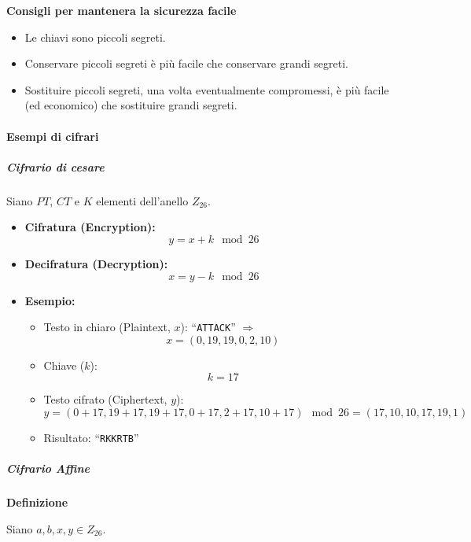 \documentclass{article}
\begin{document}
            \textbf{Consigli per mantenera la sicurezza facile}
            \begin{itemize}
                \item Le chiavi sono piccoli segreti.
                \item Conservare piccoli segreti è più facile che conservare grandi segreti.
                \item Sostituire piccoli segreti, una volta eventualmente compromessi, è più facile (ed economico) che sostituire grandi segreti.
            \end{itemize}

        \paragraph{Esempi di cifrari} 
            \subparagraph{Cifrario di cesare}

            Siano $PT$, $CT$ e $K$ elementi dell'anello $Z_{26}$.

            \begin{itemize}
                \item \textbf{Cifratura (Encryption):} \[
                y = x + k \mod 26
                \]
                
                \item \textbf{Decifratura (Decryption):} \[
                x = y - k \mod 26
                \]
                
                \item \textbf{Esempio:}
                \begin{itemize}
                    \item Testo in chiaro (Plaintext, $x$): ``\texttt{ATTACK}'' $\Rightarrow$ \[x = (0, 19, 19, 0, 2, 10)\]
                    \item Chiave ($k$): \[k = 17\]
                    \item Testo cifrato (Ciphertext, $y$): \[
                    y = (0+17, 19+17, 19+17, 0+17, 2+17, 10+17) \mod 26 = (17, 10, 10, 17, 19, 1)
                    \]
                    \item Risultato: ``\texttt{RKKRTB}''
                \end{itemize}
            \end{itemize}

            \subparagraph{Cifrario Affine}

            \textbf{Definizione}

Siano $a, b, x, y \in Z_{26}$.
\end{document}

